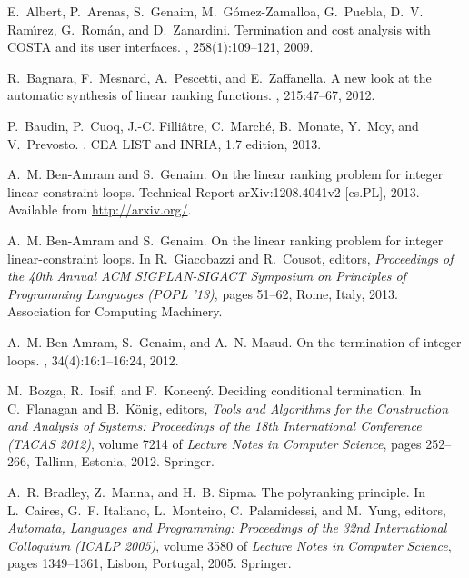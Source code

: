 \documentclass{acm_proc_article-sp}
\begin{document}
\begin{thebibliography}{10}

E.~Albert, P.~Arenas, S.~Genaim, M.~G{\'o}mez-Zamalloa, G.~Puebla, D.~V.
  Ram\'{\i}rez, G.~Rom{\'a}n, and D.~Zanardini.
\newblock Termination and cost analysis with {COSTA} and its user interfaces.
,
  258(1):109--121, 2009.

R.~Bagnara, F.~Mesnard, A.~Pescetti, and E.~Zaffanella.
\newblock A new look at the automatic synthesis of linear ranking functions.
, 215:47--67, 2012.

P.~Baudin, P.~Cuoq, J.-C. Filli\^{a}tre, C.~March\'{e}, B.~Monate, Y.~Moy, and
  V.~Prevosto.
.
\newblock CEA LIST and INRIA, 1.7 edition, 2013.

A.~M. Ben-Amram and S.~Genaim.
\newblock On the linear ranking problem for integer linear-constraint loops.
\newblock Technical Report arXiv:1208.4041v2 [cs.PL], 2013.
\newblock Available from \url{http://arxiv.org/}.

A.~M. Ben-Amram and S.~Genaim.
\newblock On the linear ranking problem for integer linear-constraint loops.
\newblock In R.~Giacobazzi and R.~Cousot, editors, {\em Proceedings of the 40th
  Annual ACM SIGPLAN-SIGACT Symposium on Principles of Programming Languages
  (POPL '13)}, pages 51--62, Rome, Italy, 2013. Association for Computing
  Machinery.

A.~M. Ben-Amram, S.~Genaim, and A.~N. Masud.
\newblock On the termination of integer loops.
,
  34(4):16:1--16:24, 2012.

M.~Bozga, R.~Iosif, and F.~Konecn{\'y}.
\newblock Deciding conditional termination.
\newblock In C.~Flanagan and B.~K{\"o}nig, editors, {\em Tools and Algorithms
  for the Construction and Analysis of Systems: Proceedings of the 18th
  International Conference (TACAS 2012)}, volume 7214 of {\em Lecture Notes in
  Computer Science}, pages 252--266, Tallinn, Estonia, 2012. Springer.

A.~R. Bradley, Z.~Manna, and H.~B. Sipma.
\newblock The polyranking principle.
\newblock In L.~Caires, G.~F. Italiano, L.~Monteiro, C.~Palamidessi, and
  M.~Yung, editors, {\em Automata, Languages and Programming: Proceedings of
  the 32nd International Colloquium (ICALP 2005)}, volume 3580 of {\em Lecture
  Notes in Computer Science}, pages 1349--1361, Lisbon, Portugal, 2005.
  Springer.


\end{thebibliography}
\end{document}

